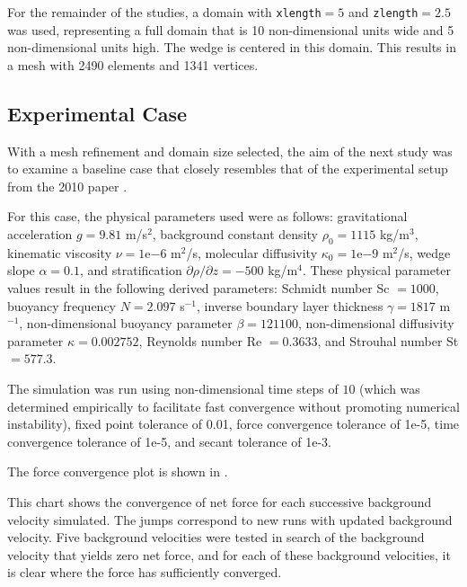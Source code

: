 \documentclass[12pt]{article}
\begin{document}
For the remainder of the studies, a domain with  \texttt{xlength}$=5$ and \texttt{zlength}$=2.5$ was used, representing a full domain that is 10 non-dimensional units wide and 5 non-dimensional units high. The wedge is centered in this domain. This results in a mesh with 2490 elements and 1341 vertices.

\subsection{Experimental Case}

With a mesh refinement and domain size selected, the aim of the next study was to examine a baseline case that closely resembles that of the experimental setup from the 2010 paper \cite{allshouse2010propulsion}.

For this case, the physical parameters used were as follows: gravitational acceleration $g=9.81$ m/s$^2$, background constant density $\rho_0=1115$ kg/m$^3$, kinematic viscosity $\nu=1$e$-6$ m$^2$/s, molecular diffusivity $\kappa_0=1$e$-9$ m$^2$/s, wedge slope $\alpha=0.1$, and stratification $\partial \rho/\partial z=-500$ kg/m$^4$. These physical parameter values result in the following derived parameters: Schmidt number Sc $=1000$, buoyancy frequency $N=2.097$ s$^{-1}$, inverse boundary layer thickness $\gamma=1817$ m$^{-1}$, non-dimensional buoyancy parameter $\beta=121100$, non-dimensional diffusivity parameter $\kappa=0.002752$, Reynolds number Re $=0.3633$, and Strouhal number St $=577.3$.

The simulation was run using non-dimensional time steps of $10$ (which was determined empirically to facilitate fast convergence without promoting numerical instability), fixed point tolerance of 0.01, force convergence tolerance of 1e-5, time convergence tolerance of 1e-5, and secant tolerance of 1e-3.

The force convergence plot is shown in .


This chart shows the convergence of net force for each successive background velocity simulated. The jumps correspond to new runs with updated background velocity. Five background velocities were tested in search of the background velocity that yields zero net force, and for each of these background velocities, it is clear where the force has sufficiently converged.
\end{document}
